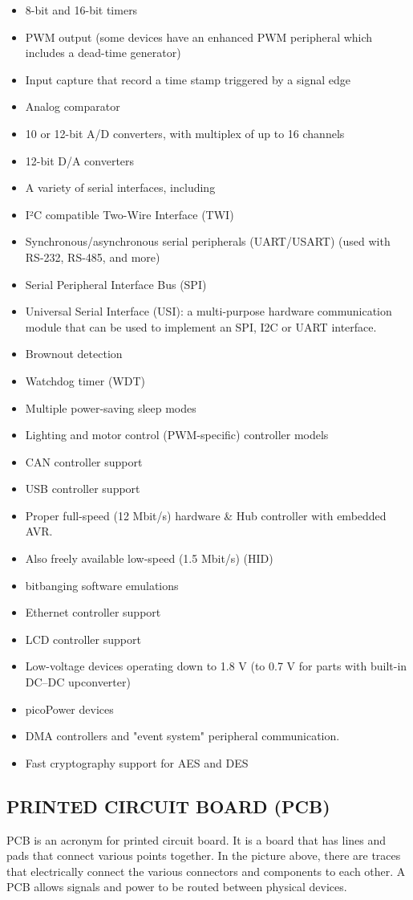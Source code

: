 \documentclass[12pt]{article}
\begin{document}
\begin{itemize}
\item 8-bit and 16-bit timers
\item  PWM output (some devices have an enhanced PWM peripheral which includes a dead-time generator)
\item Input capture that record a time stamp triggered by a signal edge
\item Analog comparator
\item 10 or 12-bit A/D converters, with multiplex of up to 16 channels
\item 12-bit D/A converters
\item A variety of serial interfaces, including
\item I²C compatible Two-Wire Interface (TWI)
\item Synchronous/asynchronous serial peripherals (UART/USART) (used with RS-232, RS-485, and more)
\item Serial Peripheral Interface Bus (SPI)
\item Universal Serial Interface (USI): a multi-purpose hardware communication module that can be used to implement an SPI, I2C or UART interface.
\item Brownout detection
\item Watchdog timer (WDT)
\item Multiple power-saving sleep modes
\item Lighting and motor control (PWM-specific) controller models
\item CAN controller support
\item USB controller support
\item Proper full-speed (12 Mbit/s) hardware \& Hub controller with embedded AVR.
\item Also freely available low-speed (1.5 Mbit/s) (HID) 
\item bitbanging software emulations
\item Ethernet controller support
\item LCD controller support
\item Low-voltage devices operating down to 1.8 V (to 0.7 V for parts with built-in DC–DC upconverter)
\item picoPower devices
\item DMA controllers and "event system" peripheral communication.
\item Fast cryptography support for AES and DES
\end{itemize}
\subsection{PRINTED CIRCUIT BOARD (PCB)}
PCB is an acronym for printed circuit board. It is a board that has lines and pads that connect various points together. In the picture above, there are traces that electrically connect the various connectors and components to each other. A PCB allows signals and power to be routed between physical devices.
\end{document}
